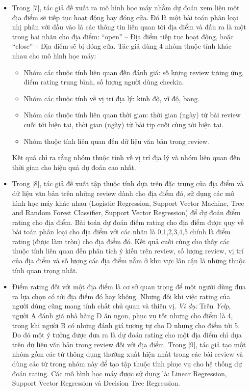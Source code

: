 \documentclass[12pt]{extarticle}
\begin{document}
			\begin{itemize}
				\item Trong [7], tác giả đề xuất ra mô hình học máy nhằm dự đoán xem liệu một địa điểm sẽ tiếp tục hoạt động hay đóng cửa. Đó là một bài toán phân loại nhị phân với đầu vào là các thông tin liên quan tới địa điểm và đầu ra là một trong hai nhãn cho địa điểm: “open” – Địa điểm tiếp tục hoạt động, hoặc “close” – Địa điểm sẽ bị đóng cửa. Tác giả dùng 4 nhóm thuộc tính khác nhau cho mô hình học máy:
					\begin{itemize}
						\item Nhóm các thuộc tính liên quan đến đánh giá: số lượng review tương ứng, điểm rating trung bình, số lượng người dùng checkin.
						\item Nhóm các thuộc tính về vị trí địa lý: kinh độ, vĩ độ, bang.
						\item Nhóm các thuộc tính liên quan thời gian: thời gian (ngày) từ bài review cuối tới hiện tại, thời gian (ngày) từ bài tip cuối cùng tới hiện tại.
						\item Nhóm thuộc tính liên quan đến dữ liệu văn bản trong review.
					\end{itemize}
					Kết quả chỉ ra rằng nhóm thuộc tính về vị trí địa lý và nhóm liên quan đến thời gian cho hiệu quả dự đoán cao nhất.
				\item Trong [8], tác giả đề xuất tập thuộc tính dựa trên đặc trưng của địa điểm và dữ liệu văn bản trên những review dành cho địa điểm đó, sử dụng các mô hình học máy khác nhau (Logistic Regression, Support Vector Machine, Tree and Random Forest Classifier, Support Vector Regression) để dự đoán điểm rating cho địa điểm. Bài toán dự đoán điểm rating cho địa điểm được quy về bài toán phân loại cho địa điểm với các nhãn là 0,1,2,3,4,5 chính là điểm rating (được làm tròn) cho địa điểm đó. Kết quả cuối cùng cho thấy các thuộc tính liên quan đến phân tích ý kiến trên review, số lượng review, vị trí của địa điểm và số lượng các địa điểm nằm ở khu vực lân cận là những thuộc tính quan trọng nhất.
				\item Điểm rating đối với một địa điểm là cơ sở quan trọng để một người dùng đưa ra lựa chọn có tới địa điểm đó hay không. Nhưng đôi khi việc rating của người dùng cũng mang tính chất chủ quan và thiên vị. \textit{Ví dụ:} Trên \textit{Yelp}, người A đánh giá nhà hàng D ăn ngon, phục vụ tốt nhưng cho điểm là 4, trong khi người B có những đánh giá tương tự cho D nhưng cho điểm tới 5. Do đó một ý tưởng được đưa ra là dự đoán rating cho một địa điểm chỉ dựa trên dữ liệu văn bản trong review đối với địa điểm. Trong [9], tác giả tạo một nhóm gồm các từ thông dụng thường xuất hiện nhất trong các bài review và dùng các từ trong nhóm này để tạo tập thuộc tính phục vụ cho hệ thống dự đoán rating. Các mô hình học máy được sử dụng là: Linear Regression, Support Vector Regression và Decision Tree Regression.

\end{itemize}
\end{document}
